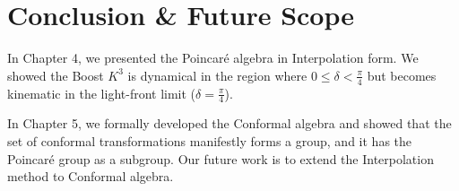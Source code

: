\documentclass[12pt,a4paper]{report}
\begin{document}
\noindent{\rule{\textwidth}{1.5pt}}

\chapter{Conclusion \& Future Scope}

In Chapter 4, we presented the Poincaré algebra in Interpolation form. We showed the Boost $K^{3}$ is dynamical in the region where $0\leq\delta<\frac{\pi}{4}$ but becomes kinematic in the light-front limit ($\delta=\frac{\pi}{4}$).

In Chapter 5, we formally developed the Conformal algebra and showed that the set of conformal transformations manifestly forms a group, and it has the Poincaré group as a subgroup. Our future work is to extend the Interpolation method to Conformal algebra.
	
\end{document}
